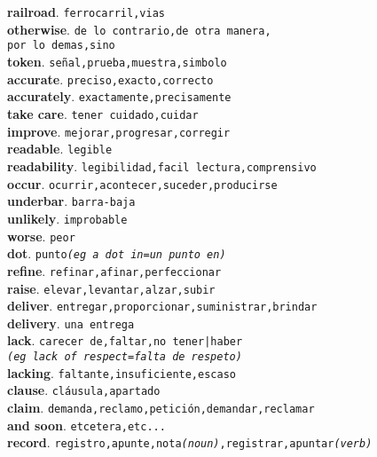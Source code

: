 \documentclass[twocolumn]{article}
\begin{document}
	\textsf{\textbf{railroad}}. \texttt{ferrocarril,vias}\\
	\textsf{\textbf{otherwise}}. \texttt{de lo contrario,de otra manera,\\por lo demas,sino}\\
	\textsf{\textbf{token}}. \texttt{se\~nal,prueba,muestra,simbolo}\\
	\textsf{\textbf{accurate}}. \texttt{preciso,exacto,correcto}\\
	\textsf{\textbf{accurately}}. \texttt{exactamente,precisamente}\\
	\textsf{\textbf{take care}}. \texttt{tener cuidado,cuidar}\\
	\textsf{\textbf{improve}}. \texttt{mejorar,progresar,corregir}\\
	\textsf{\textbf{readable}}. \texttt{legible}\\
	\textsf{\textbf{readability}}. \texttt{legibilidad,facil lectura,comprensivo}\\
	\textsf{\textbf{occur}}. \texttt{ocurrir,acontecer,suceder,producirse}\\
	\textsf{\textbf{underbar}}. \texttt{barra-baja}\\
	\textsf{\textbf{unlikely}}. \texttt{improbable}\\
	\textsf{\textbf{worse}}. \texttt{peor}\\
	\textsf{\textbf{dot}}. \texttt{punto{\scriptsize \textsl{(eg a dot in=un punto en)}}}\\
	\textsf{\textbf{refine}}. \texttt{refinar,afinar,perfeccionar}\\
	\textsf{\textbf{raise}}. \texttt{elevar,levantar,alzar,subir}\\
	\textsf{\textbf{deliver}}. \texttt{entregar,proporcionar,suministrar,brindar}\\
	\textsf{\textbf{delivery}}. \texttt{una entrega}\\
	\textsf{\textbf{lack}}. \texttt{carecer de,faltar,no tener|haber\\{\scriptsize \textsl{(eg lack of respect=falta de respeto)}}}\\
	\textsf{\textbf{lacking}}. \texttt{faltante,insuficiente,escaso}\\
	\textsf{\textbf{clause}}. \texttt{cl\'ausula,apartado}\\
	\textsf{\textbf{claim}}. \texttt{demanda,reclamo,petici\'on,demandar,reclamar}\\
	\textsf{\textbf{and soon}}. \texttt{etcetera,etc...}\\
	\textsf{\textbf{record}}. \texttt{registro,apunte,nota{\scriptsize \textsl{(noun)}},registrar,apuntar{\scriptsize \textsl{(verb)}}}\\
\end{document}

